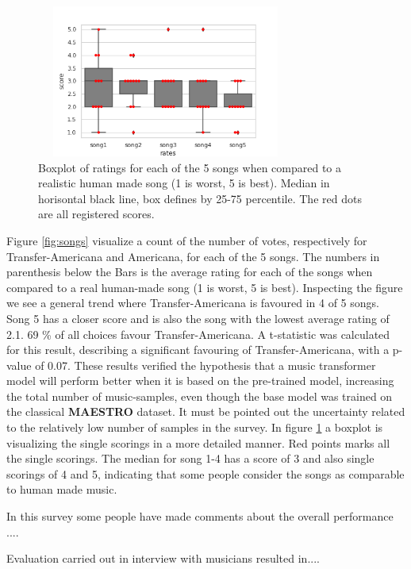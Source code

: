 \documentclass{IEEEtran}
\begin{document}
        \begin{figure}
            \centering
            \includegraphics[width=8.5cm, height=5cm]{scores.png}
            \caption{Boxplot of ratings for each of the 5 songs when compared to a realistic human made song (1 is worst, 5 is best). Median in horisontal black line, box defines by 25-75 percentile. The red dots are all registered scores.}
             \label{fig:scores}
        \end{figure} 

        Figure \ref{fig:songs} visualize a count of the number of votes, respectively for Transfer-Americana
        and Americana, for each of the 5 songs. The numbers in parenthesis below the Bars is the average rating for each of the songs when compared to a real human-made song (1 is worst, 5 is best). Inspecting the figure we see a general trend where Transfer-Americana is favoured in 4 of 5 songs. Song 5 has a closer score and is also the song with the lowest average rating of 2.1. 69 \% of all choices favour Transfer-Americana. A t-statistic was calculated for this result, describing a significant favouring of 
        Transfer-Americana, with a p-value of 0.07. These results verified the hypothesis that a music transformer model will perform better when it is based on the pre-trained model, increasing the total number of music-samples, even though the base model was trained on the classical \textbf{MAESTRO} dataset. It must be pointed out the uncertainty related to the relatively low number of samples in the survey. 
        In figure \ref{fig:scores} a boxplot is visualizing the single scorings in a more detailed manner. Red points marks all the single scorings. The median for song 1-4 has a score of 3 and also single scorings of 4 and 5, indicating that some people consider the songs as comparable to human made music.
        
        In this survey some people have made comments about the overall performance ....

        Evaluation carried out in interview with musicians resulted in.... %
\end{document}
